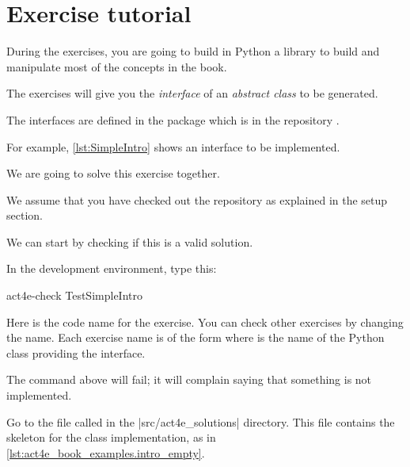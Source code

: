 
\section{Exercise tutorial}
\label{sec:exercise-tutorial}

During the exercises, you are going to build in Python a library to build and manipulate most of the concepts in the book.

The exercises will give you the \emph{interface} of an \emph{abstract class} to be generated.

The interfaces are defined in the package  which is in the repository .
%

For example, \cref{lst:SimpleIntro} shows an interface  to be implemented.


We are going to solve this exercise together.

We assume that you have checked out the repository as explained in the setup section.


We can start by checking if this is a valid solution.

In the development environment, type this:

\begin{console}
    act4e-check TestSimpleIntro
\end{console}

Here  is the code name for the exercise.
You can check other exercises by changing the name.
Each exercise name is of the form  where  is the name of the Python class
providing the interface.

The command above will fail; it will complain saying that something is not implemented.

Go to the file called  in the \files|src/act4e_solutions| directory.
This file contains the skeleton for the class implementation, as in \cref{lst:act4e_book_examples.intro_empty}.

\begin{longcode}
    \caption{}

    \label{lst:act4e_book_examples.intro_empty}
\end{longcode}

